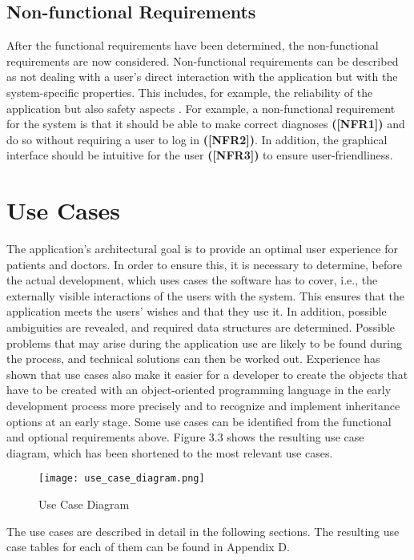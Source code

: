 \subsection{Non-functional Requirements}
After the functional requirements have been determined, the non-functional requirements are now considered. Non-functional requirements can be described as not dealing with a user's direct interaction with the application but with the system-specific properties. This includes, for example, the reliability of the application but also safety aspects \cite{.req2}. For example, a non-functional requirement for the system is that it should be able to make correct diagnoses \textbf{([NFR1])} and do so without requiring a user to log in \textbf{([NFR2])}. In addition, the graphical interface should be intuitive for the user \textbf{([NFR3])} to ensure user-friendliness.



\section{Use Cases}
The application's architectural goal is to provide an optimal user experience for patients and doctors. In order to ensure this, it is necessary to determine, before the actual development, which uses cases the software has to cover, i.e., the externally visible interactions of the users with the system. This ensures that the application meets the users' wishes and that they use it. In addition, possible ambiguities are revealed, and required data structures are determined. Possible problems that may arise during the application use are likely to be found during the process, and technical solutions can then be worked out. Experience has shown that use cases also make it easier for a developer to create the objects that have to be created with an object-oriented programming language in the early development process more precisely and to recognize and implement inheritance options at an early stage. Some use cases can be identified from the functional and optional requirements above. Figure 3.3 shows the resulting use case diagram, which has been shortened to the most relevant use cases. 

\begin{figure}[H]
	\centering
	\texttt{[image: use\_case\_diagram.png]}
	\caption[Use Case Diagram]{Use Case Diagram}
\end{figure}
\noindent
The use cases are described in detail in the following sections. The resulting use case tables for each of them can be found in Appendix D.

